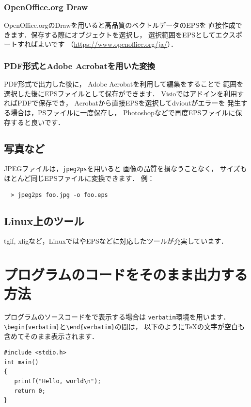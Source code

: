 \documentclass[twocolumn]{jsarticle}
\begin{document}
\subsubsection{OpenOffice.org Draw}
OpenOffice.orgのDrawを用いると高品質のベクトルデータのEPSを
直接作成できます．保存する際にオブジェクトを選択し，
選択範囲をEPSとしてエクスポートすればよいです
（\url{https://www.openoffice.org/ja/}）．


\subsubsection{PDF形式とAdobe Acrobatを用いた変換}
PDF形式で出力した後に，
Adobe Acrobatを利用して編集をすることで
範囲を選択した後にEPSファイルとして保存ができます．
Visioではアドインを利用すればPDFで保存でき，
Acrobatから直接EPSを選択してdvioutがエラーを
発生する場合は，PSファイルに一度保存し，
Photoshopなどで再度EPSファイルに保存すると良いです．

\subsection{写真など}
JPEGファイルは，\texttt{jpeg2ps}を用いると
画像の品質を損なうことなく，
サイズもほとんど同じEPSファイルに変換できます．
例：
\begin{verbatim}
  > jpeg2ps foo.jpg -o foo.eps
\end{verbatim}

\subsection{Linux上のツール}
tgif, xfigなど，Linuxでは\LaTeXe やEPSなどに対応したツールが充実しています．


\section{プログラムのコードをそのまま出力する方法}
プログラムのソースコードを\LaTeXe で表示する場合は
\verb+verbatim+環境を用います．
\verb+\begin{verbatim}+と\verb+\end{verbatim}+の間は，
以下のように\TeX の文字が空白も含めてそのまま表示されます．
\begin{verbatim}
#include <stdio.h>
int main()
{
   printf("Hello, world\n");
   return 0;
} 
\end{verbatim}
\end{document}
